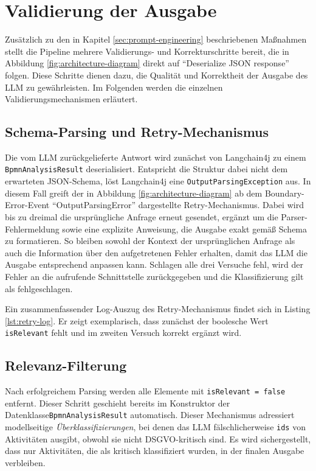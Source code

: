 \section{Validierung der Ausgabe}\label{sec:validierung-der-ausgabe}

Zusätzlich zu den in Kapitel \ref{sec:prompt-engineering} beschriebenen Maßnahmen stellt die Pipeline mehrere Validierungs- und Korrekturschritte bereit, die in Abbildung \ref{fig:architecture-diagram} direkt auf \enquote{Deserialize JSON response} folgen. Diese Schritte dienen dazu, die Qualität und Korrektheit der Ausgabe des \ac{LLM} zu gewährleisten. Im Folgenden werden die einzelnen Validierungsmechanismen erläutert.

\subsection*{Schema-Parsing und Retry-Mechanismus}

Die vom \ac{LLM} zurückgelieferte Antwort wird zunächst von Langchain4j zu einem \texttt{BpmnAnalysisResult} deserialisiert. Entspricht die Struktur dabei nicht dem erwarteten JSON-Schema, löst Langchain4j eine \texttt{OutputParsingException} aus. In diesem Fall greift der in Abbildung \ref{fig:architecture-diagram} ab dem Boundary-Error-Event \enquote{OutputParsingError} dargestellte Retry-Mechanismus. Dabei wird bis zu dreimal die ursprüngliche Anfrage erneut gesendet, ergänzt um die Parser-Fehlermeldung sowie eine explizite Anweisung, die Ausgabe exakt gemäß Schema zu formatieren. So bleiben sowohl der Kontext der ursprünglichen Anfrage als auch die Information über den aufgetretenen Fehler erhalten, damit das \ac{LLM} die Ausgabe entsprechend anpassen kann. Schlagen alle drei Versuche fehl, wird der Fehler an die aufrufende Schnittstelle zurückgegeben und die Klassifizierung gilt als fehlgeschlagen.

Ein zusammenfassender Log-Auszug des Retry-Mechanismus findet sich in Listing \ref{lst:retry-log}. Er zeigt exemplarisch, dass zunächst der boolesche Wert \texttt{isRelevant} fehlt und im zweiten Versuch korrekt ergänzt wird.

\subsection*{Relevanz-Filterung}

Nach erfolgreichem Parsing werden alle Elemente mit \texttt{isRelevant = false} entfernt. Dieser Schritt geschieht bereits im Konstruktor der Datenklasse\break\texttt{BpmnAnalysisResult} automatisch. Dieser Mechanismus adressiert modellseitige \emph{Überklassifizierungen}, bei denen das \ac{LLM} fälschlicherweise \texttt{ids} von Aktivitäten ausgibt, obwohl sie nicht \ac{DSGVO}-kritisch sind. Es wird sichergestellt, dass nur Aktivitäten, die als kritisch klassifiziert wurden, in der finalen Ausgabe verbleiben.

